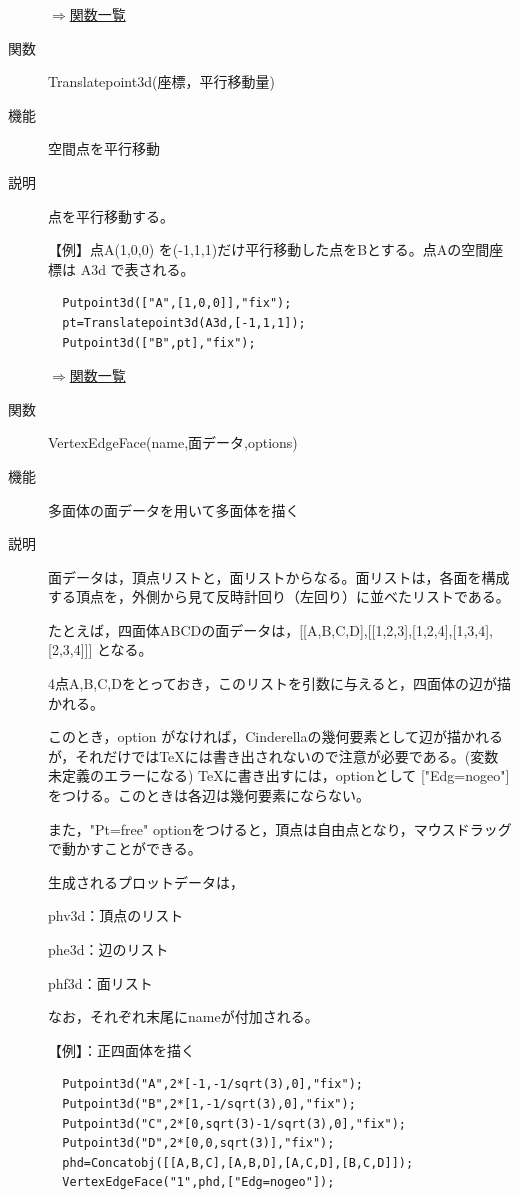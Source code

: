 \documentclass[papersize,a4paper,12pt,uplatex]{jsarticle}
\begin{document}
\begin{description}
\begin{flushright} \hyperlink{functionlist}{$\Rightarrow$関数一覧}\end{flushright}

\hypertarget{translatepoint3d}{}
\item[関数]  Translatepoint3d(座標，平行移動量)
\item[機能]  空間点を平行移動
\item[説明]  点を平行移動する。

\vspace{\baselineskip}
【例】点A(1,0,0) を(-1,1,1)だけ平行移動した点をBとする。点Aの空間座標は A3d で表される。 
\begin{verbatim}
  Putpoint3d(["A",[1,0,0]],"fix");
  pt=Translatepoint3d(A3d,[-1,1,1]);
  Putpoint3d(["B",pt],"fix");
\end{verbatim}
\vspace{\baselineskip}
\begin{flushright} \hyperlink{functionlist}{$\Rightarrow$関数一覧}\end{flushright}

\hypertarget{vertexedgeface}{}
\item[関数]  VertexEdgeFace(name,面データ,options)
\item[機能]  多面体の面データを用いて多面体を描く
\item[説明]  面データは，頂点リストと，面リストからなる。面リストは，各面を構成する頂点を，外側から見て反時計回り（左回り）に並べたリストである。

たとえば，四面体ABCDの面データは，[[A,B,C,D],[[1,2,3],[1,2,4],[1,3,4],[2,3,4]]] となる。

4点A,B,C,Dをとっておき，このリストを引数に与えると，四面体の辺が描かれる。

このとき，option がなければ，Cinderellaの幾何要素として辺が描かれるが，それだけではTeXには書き出されないので注意が必要である。(変数未定義のエラーになる)  TeXに書き出すには，optionとして ["Edg=nogeo"] をつける。このときは各辺は幾何要素にならない。

また，"Pt=free" optionをつけると，頂点は自由点となり，マウスドラッグで動かすことができる。

生成されるプロットデータは，

phv3d：頂点のリスト

phe3d：辺のリスト

phf3d：面リスト

なお，それぞれ末尾にnameが付加される。

\vspace{\baselineskip}
【例】：正四面体を描く
\begin{verbatim}
  Putpoint3d("A",2*[-1,-1/sqrt(3),0],"fix");
  Putpoint3d("B",2*[1,-1/sqrt(3),0],"fix");
  Putpoint3d("C",2*[0,sqrt(3)-1/sqrt(3),0],"fix");
  Putpoint3d("D",2*[0,0,sqrt(3)],"fix");
  phd=Concatobj([[A,B,C],[A,B,D],[A,C,D],[B,C,D]]);
  VertexEdgeFace("1",phd,["Edg=nogeo"]);
\end{verbatim}
        \begin{center}  \end{center}


\end{description}
\end{document}
